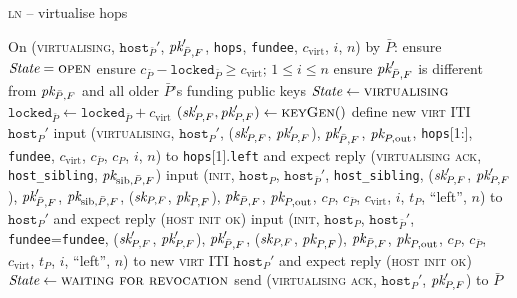 \begin{center}
  \begin{processbox}{\textsc{ln} -- virtualise hops}
    \ \\
    \begin{algorithmic}[1]
      \State On (\textsc{virtualising}, $\texttt{host}_{\bar{P}}'$,
      $\textit{pk}_{\bar{P}, F}'$, \texttt{hops}, \texttt{fundee}, $c_{\mathrm{virt}}$,
      $i$, $n$) by $\bar{P}$:
      \Indent
        \State ensure $\itistate = \textsc{open}$
        \State ensure $c_{\bar{P}} - \texttt{locked}_{\bar{P}} \geq
        c_{\mathrm{virt}}$; $1 \leq i \leq n$
        \State ensure $\textit{pk}_{\bar{P}, F}'$ is different from $\textit{pk}_{\bar{P}, F}$ and
        all older $\bar{P}$'s funding public keys
        \State $\itistate \gets \textsc{virtualising}$
        \State $\texttt{locked}_{\bar{P}} \gets \texttt{locked}_{\bar{P}} +
        c_{\mathrm{virt}}$
        \State $(\textit{sk}_{P, F}', \textit{pk}_{P, F}') \gets \textsc{keyGen}()$
         
          \State define new \textsc{virt} ITI $\texttt{host}_P'$
          \State input (\textsc{virtualising}, $\texttt{host}_P'$, ($\textit{sk}_{P,
          F}'$, $\textit{pk}_{P, F}'$), $\textit{pk}_{\bar{P}, F}'$, $\textit{pk}_{P, \mathrm{out}}$,
          \texttt{hops}[1:], \texttt{fundee}, $c_{\mathrm{virt}}$,
          $c_{\bar{P}}$, $c_P$, $i$, $n$) to \texttt{hops}[1].\texttt{left} and
          expect reply (\textsc{virtualising ack}, \texttt{host\_sibling},
          $\textit{pk}_{\mathrm{sib}, \bar{P}, F}$)
          \State input (\textsc{init}, $\texttt{host}_P$,
          $\texttt{host}_{\bar{P}}'$, \texttt{host\_sibling}, ($\textit{sk}_{P, F}'$,
          $\textit{pk}_{P, F}'$), $\textit{pk}_{\bar{P}, F}'$, $\textit{pk}_{\mathrm{sib}, \bar{P}, F}$,
          ($\textit{sk}_{P, F}$, $\textit{pk}_{P, F}$), $\textit{pk}_{\bar{P}, F}$, $\textit{pk}_{P, \mathrm{out}}$,
          $c_P$, $c_{\bar{P}}$, $c_{\mathrm{virt}}$, $i$, $t_P$, ``left'', $n$)
          to $\texttt{host}_P'$ and expect reply (\textsc{host init ok})
        \Else \: 
          \State input (\textsc{init}, $\texttt{host}_P$,
          $\texttt{host}_{\bar{P}}'$, \texttt{fundee}=\texttt{fundee}, ($\textit{sk}_{P,
          F}'$, $\textit{pk}_{P, F}'$), $\textit{pk}_{\bar{P}, F}'$, ($\textit{sk}_{P, F}$, $\textit{pk}_{P, F}$),
          $\textit{pk}_{\bar{P}, F}$, $\textit{pk}_{P, \mathrm{out}}$, $c_P$, $c_{\bar{P}}$,
          $c_{\mathrm{virt}}$, $t_P$, $i$, ``left'', $n$) to new \textsc{virt}
          ITI $\texttt{host}_P'$ and expect reply (\textsc{host init ok})
        \EndIf
        \State $\itistate \gets \textsc{waiting for revocation}$
        \State send (\textsc{virtualising ack}, $\texttt{host}_P'$, $\textit{pk}_{P, F}'$)
        to $\bar{P}$
      \EndIndent
      \Statex


\end{algorithmic}
\end{processbox}
\end{center}
